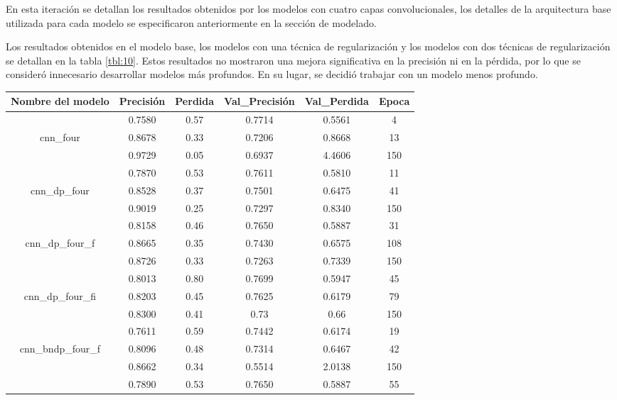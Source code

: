 En esta iteración se detallan los resultados obtenidos por los modelos con cuatro capas convolucionales, los detalles de la arquitectura base utilizada para cada modelo se especificaron anteriormente en la sección de modelado. 

Los resultados obtenidos en el modelo base, los modelos con una técnica de regularización y los modelos con dos técnicas de regularización se detallan en la tabla \ref{tbl:10}. Estos resultados no mostraron una mejora significativa en la precisión ni en la pérdida, por lo que se consideró innecesario desarrollar modelos más profundos. En su lugar, se decidió trabajar con un modelo menos profundo.


\begin{table}[!ht]
	\centering
	\begin{tabular}{|c|c|c|c|c|c|}
		\hline
		\textbf{Nombre del modelo} & \textbf{Precisión} & \textbf{Perdida} & \textbf{Val\_Precisión} & \textbf{Val\_Perdida} & \textbf{Epoca} \\ \hline
		~ & 0.7580 & 0.57 & 0.7714 & 0.5561 & 4 \\ \cline{2-6}
		cnn\_four & 0.8678 & 0.33 & 0.7206 & 0.8668 & 13 \\ \cline{2-6}
		~ & 0.9729 & 0.05 & 0.6937 & 4.4606 & 150 \\ \hline
		~ & 0.7870 & 0.53 & 0.7611 & 0.5810 & 11 \\ \cline{2-6}
		cnn\_dp\_four & 0.8528 & 0.37 & 0.7501 & 0.6475 & 41 \\ \cline{2-6}
		~ & 0.9019 & 0.25 & 0.7297 & 0.8340 & 150 \\ \hline
		~ & 0.8158 & 0.46 & 0.7650 & 0.5887 & 31 \\ \cline{2-6}
		cnn\_dp\_four\_f & 0.8665 & 0.35 & 0.7430 & 0.6575 & 108 \\ \cline{2-6}
		~ & 0.8726 & 0.33 & 0.7263 & 0.7339 & 150 \\ \hline
		~ & 0.8013 & 0.80 & 0.7699 & 0.5947 & 45 \\ \cline{2-6}
		cnn\_dp\_four\_fi & 0.8203 & 0.45 & 0.7625 & 0.6179 & 79 \\ \cline{2-6}
		~ & 0.8300 & 0.41 & 0.73 & 0.66 & 150 \\ \hline
		~ & 0.7611 & 0.59 & 0.7442 & 0.6174 & 19 \\ \cline{2-6}
		cnn\_bndp\_four\_f & 0.8096 & 0.48 & 0.7314 & 0.6467 & 42 \\ \cline{2-6}
		~ & 0.8662 & 0.34 & 0.5514 & 2.0138 & 150 \\ \hline
		~ & 0.7890 & 0.53 & 0.7650 & 0.5887 & 55 \\ \cline{2-6}

\end{tabular}
\end{table}
